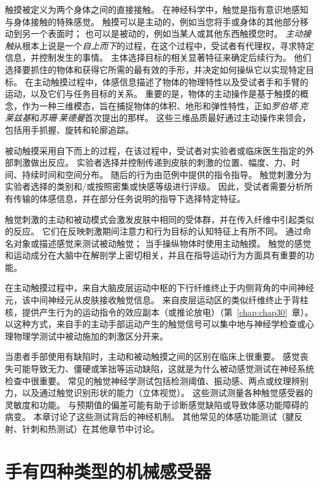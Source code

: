触摸被定义为两个身体之间的直接接触。
在神经科学中，触觉是指有意识地感知与身体接触的特殊感觉。
触摸可以是主动的，例如当您将手或身体的其他部分移动到另一个表面时；
也可以是被动的，例如当某人或其他东西触摸您时。
\textit{主动接触}从根本上说是一个\textit{自上而下}的过程，在这个过程中，受试者有代理权，寻求特定信息，并控制发生的事情。
主体选择目标的相关显著特征来确定后续行为。
他们选择要抓住的物体和获得它所需的最有效的手形，并决定如何操纵它以实现特定目标。
在主动触摸过程中，体感信息描述了物体的物理特性以及受试者手和手臂的运动，以及它们与任务目标的关系。
重要的是，物体的主动操作是基于触摸的概念，作为一种三维模态，旨在捕捉物体的体积、地形和弹性特性，正如\textit{罗伯塔$\cdot$克莱兹基}和\textit{苏珊$\cdot$莱德曼}首次提出的那样。
这些三维品质最好通过主动操作来领会，包括用手抓握、旋转和轮廓追踪。


被动触摸采用自下而上的过程，在该过程中，受试者对实验者或临床医生指定的外部刺激做出反应。
实验者选择并控制传递到皮肤的刺激的位置、幅度、力、时间、持续时间和空间分布。
随后的行为由范例中提供的指令指导。
触觉刺激分为实验者选择的类别和/或按照密集或快感等级进行评级。
因此，受试者需要分析所有传输的体感信息，并在部分任务说明的指导下选择特定特征。


触觉刺激的主动和被动模式会激发皮肤中相同的受体群，并在传入纤维中引起类似的反应。
它们在反映刺激期间注意力和行为目标的认知特征上有所不同。
通过命名对象或描述感觉来测试被动触觉；
当手操纵物体时使用主动触摸。
触觉的感觉和运动成分在大脑中在解剖学上密切相关，并且在指导运动行为方面具有重要的功能。


在主动触摸过程中，来自大脑皮层运动中枢的下行纤维终止于内侧背角的中间神经元，该中间神经元从皮肤接收触觉信息。
来自皮层运动区的类似纤维终止于背柱核，提供产生行为的运动指令的效应副本（或推论放电）（第~\ref{chap:chap30}~章）。
以这种方式，来自手的主动手部运动产生的触觉信号可以集中地与神经学检查或心理物理学测试中被动施加的刺激区分开来。


当患者手部使用有缺陷时，主动和被动触摸之间的区别在临床上很重要。
感觉丧失可能导致无力、僵硬或笨拙等运动缺陷，这就是为什么被动感觉测试在神经系统检查中很重要。
常见的触觉神经学测试包括检测阈值、振动感、两点或纹理辨别力，以及通过触觉识别形状的能力（立体视觉）。 
这些测试测量各种触觉感受器的灵敏度和功能。
与预期值的偏差可能有助于诊断感觉缺陷或导致体感功能障碍的病变。
本章讨论了这些测试背后的神经机制。
其他常见的体感功能测试（腱反射、针刺和热测试）在其他章节中讨论。



\section{手有四种类型的机械感受器}


